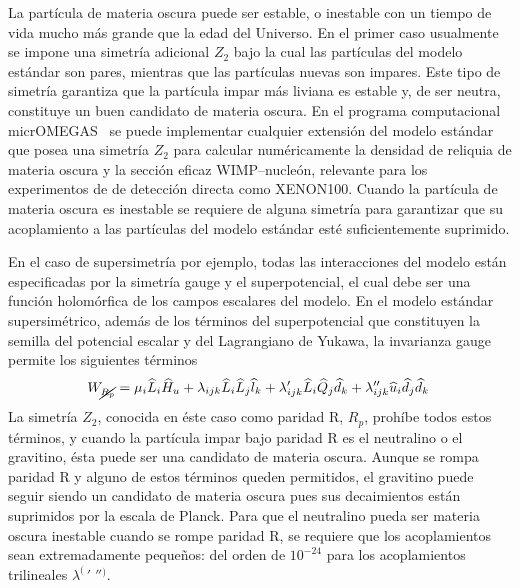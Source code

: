 La partícula de materia oscura puede ser estable, o inestable con un
tiempo de vida mucho más grande que la edad del Universo. En el primer
caso usualmente se impone una simetría adicional $Z_2$ bajo la cual
las partículas del modelo estándar son pares, mientras que las
partículas nuevas son impares. Este tipo de simetría garantiza que la
partícula impar más liviana es estable y, de ser neutra, constituye un
buen candidato de materia oscura. En el programa computacional
micrOMEGAS~\cite{Belanger:2006is} se puede implementar cualquier
extensión del modelo estándar que posea una simetría $Z_2$ para
calcular numéricamente la densidad de reliquia de materia oscura y la
sección eficaz WIMP--nucleón, relevante para los experimentos de de
detección directa como XENON100. Cuando la partícula de materia oscura
es inestable se requiere de alguna simetría para garantizar que su
acoplamiento a las partículas del modelo estándar esté suficientemente
suprimido.

En el caso de supersimetría por ejemplo, todas las interacciones del
modelo están especificadas por la simetría gauge y el superpotencial,
el cual debe ser una función holomórfica de los campos escalares del
modelo. En el modelo estándar supersimétrico, además de los términos
del superpotencial que constituyen la semilla del potencial escalar y
del Lagrangiano de Yukawa, la invarianza gauge permite los siguientes
términos
\begin{equation}
  \label{eq:5}
  W_{\cancel{R_p}} = \mu_i\widehat{L}_i\widehat{H}_u + 
  \lambda_{i j k}\widehat{L}_i\widehat{L}_j\widehat{l}_k +
  \lambda'_{i j k}\widehat{L}_i\widehat{Q}_j\widehat{d}_k + 
  \lambda''_{ijk}\widehat{u}_i\widehat{d}_j\widehat{d}_k\,
\end{equation}
La simetría $Z_2$, conocida en éste caso como paridad R, $R_p$,
prohíbe todos estos términos, y cuando la partícula impar bajo paridad
R es el neutralino o el gravitino, ésta puede ser una candidato de
materia oscura. Aunque se rompa paridad R y alguno de estos términos
queden permitidos, el gravitino puede seguir siendo un candidato de
materia oscura pues sus decaimientos están suprimidos por la escala de
Planck. Para que el neutralino pueda ser materia oscura inestable
cuando se rompe paridad R, se requiere que los acoplamientos sean
extremadamente pequeños: del orden de $10^{-24}$ para los
acoplamientos trilineales ${\lambda^{(\ }}'\;''{}^)$. 

